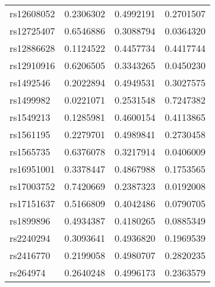 \documentclass[AMA,STIX1COL,]{WileyNJD-v2}
\begin{document}
\begin{table}[ht]
\begin{minipage}{0.5\linewidth}
\begin{tabular}{lrrr}
rs12608052 & 0.2306302 & 0.4992191 & 0.2701507\\
rs12725407 & 0.6546886 & 0.3088794 & 0.0364320\\
\addlinespace
rs12886628 & 0.1124522 & 0.4457734 & 0.4417744\\
rs12910916 & 0.6206505 & 0.3343265 & 0.0450230\\
rs1492546 & 0.2022894 & 0.4949531 & 0.3027575\\
rs1499982 & 0.0221071 & 0.2531548 & 0.7247382\\
rs1549213 & 0.1285981 & 0.4600154 & 0.4113865\\
\addlinespace
rs1561195 & 0.2279701 & 0.4989841 & 0.2730458\\
rs1565735 & 0.6376078 & 0.3217914 & 0.0406009\\
rs16951001 & 0.3378447 & 0.4867988 & 0.1753565\\
rs17003752 & 0.7420669 & 0.2387323 & 0.0192008\\
rs17151637 & 0.5166809 & 0.4042486 & 0.0790705\\
\addlinespace
rs1899896 & 0.4934387 & 0.4180265 & 0.0885349\\
rs2240294 & 0.3093641 & 0.4936820 & 0.1969539\\
rs2416770 & 0.2199058 & 0.4980707 & 0.2820235\\
rs264974 & 0.2640248 & 0.4996173 & 0.2363579\\
\bottomrule
\end{tabular}


  \end{minipage}
  \qquad
  \begin{minipage}{0.5\linewidth}
    \center
    

\end{minipage}
\end{table}
\end{document}
